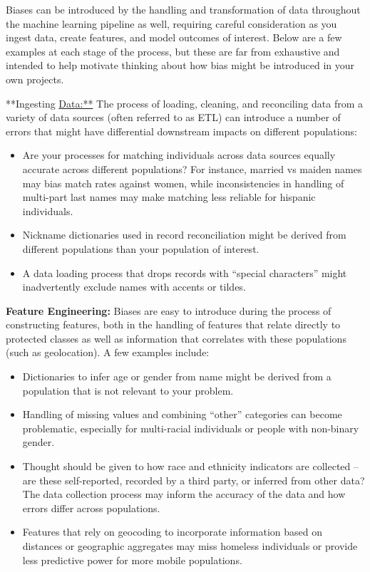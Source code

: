 \documentclass[]{krantz}
\begin{document}
Biases can be introduced by the handling and transformation of data
throughout the machine learning pipeline as well, requiring careful
consideration as you ingest data, create features, and model outcomes of
interest. Below are a few examples at each stage of the process, but
these are far from exhaustive and intended to help motivate thinking
about how bias might be introduced in your own projects.

**Ingesting \url{Data:**} The process of loading, cleaning, and
reconciling data from a variety of data sources (often referred to as
ETL) can introduce a number of errors that might have differential
downstream impacts on different populations:

\begin{itemize}
\item
  Are your processes for matching individuals across data sources
  equally accurate across different populations? For instance, married
  vs maiden names may bias match rates against women, while
  inconsistencies in handling of multi-part last names may make matching
  less reliable for hispanic individuals.
\item
  Nickname dictionaries used in record reconciliation might be derived
  from different populations than your population of interest.
\item
  A data loading process that drops records with ``special characters''
  might inadvertently exclude names with accents or tildes.
\end{itemize}

\textbf{Feature Engineering:} Biases are easy to introduce during the
process of constructing features, both in the handling of features that
relate directly to protected classes as well as information that
correlates with these populations (such as geolocation). A few examples
include:

\begin{itemize}
\item
  Dictionaries to infer age or gender from name might be derived from a
  population that is not relevant to your problem.
\item
  Handling of missing values and combining ``other'' categories can
  become problematic, especially for multi-racial individuals or people
  with non-binary gender.
\item
  Thought should be given to how race and ethnicity indicators are
  collected -- are these self-reported, recorded by a third party, or
  inferred from other data? The data collection process may inform the
  accuracy of the data and how errors differ across populations.
\item
  Features that rely on geocoding to incorporate information based on
  distances or geographic aggregates may miss homeless individuals or
  provide less predictive power for more mobile populations.
\end{itemize}
\end{document}
